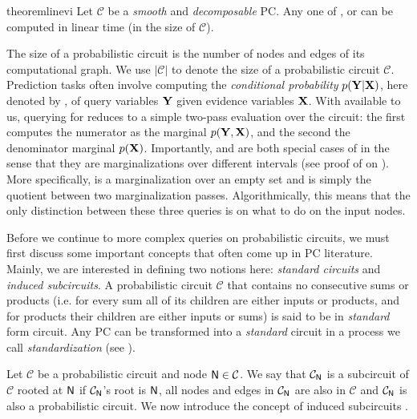 \begin{restatable}{theorem}{linevi}
  \label{thm:linevi}
  Let $\mathcal{C}$ be a \emph{smooth} and \emph{decomposable} PC. Any one of \evi{}, \mar{} or
  \con{} can be computed in linear time (in the size of $\mathcal{C}$).
\end{restatable}

The size of a probabilistic circuit is the number of nodes and edges of its computational graph. We
use $|\mathcal{C}|$ to denote the size of a probabilistic circuit $\mathcal{C}$. Prediction tasks
often involve computing the \emph{conditional probability} $p(\mathbf{Y}|\mathbf{X})$, here denoted by
\con{}, of query variables $\mathbf{Y}$ given evidence variables $\mathbf{X}$. With \mar{} available to
us, querying for \con{} reduces to a simple two-pass evaluation over the circuit: the first
computes the numerator as the marginal $p(\mathbf{Y},\mathbf{X})$, and the second the denominator
marginal $p(\mathbf{X})$. Importantly, \evi{} and \con{} are both special cases of \mar{} in the sense
that they are marginalizations over different intervals (see proof of  on
). More specifically, \evi{} is a marginalization over an empty set and
\con{} is simply the quotient between two marginalization passes. Algorithmically, this means that
the only distinction between these three queries is on what to do on the input nodes.

Before we continue to more complex queries on probabilistic circuits, we must first discuss some
important concepts that often come up in PC literature. Mainly, we are interested in defining two
notions here: \emph{standard circuits} and \emph{induced subcircuits}. A probabilistic circuit
$\mathcal{C}$ that contains no consecutive sums or products (i.e. for every sum all of its children
are either inputs or products, and for products their children are either inputs or sums) is said
to be in \emph{standard} form circuit. Any PC can be transformed into a \emph{standard} circuit in
a process we call \emph{standardization} (see ).

Let $\mathcal{C}$ be a probabilistic circuit and node $\operatorname{\textup{\textsf{N}}}\in\mathcal{C}$. We say that
$\mathcal{C}_{\operatorname{\textup{\textsf{N}}}}$ is a subcircuit of $\mathcal{C}$ rooted at $\operatorname{\textup{\textsf{N}}}$ if $\mathcal{C}_{\operatorname{\textup{\textsf{N}}}}$'s
root is $\operatorname{\textup{\textsf{N}}}$, all nodes and edges in $\mathcal{C}_{\operatorname{\textup{\textsf{N}}}}$ are also in $\mathcal{C}$ and
$\mathcal{C}_{\operatorname{\textup{\textsf{N}}}}$ is also a probabilistic circuit. We now introduce the concept of induced
subcircuits \citep{chan06,dennis15,peharz14}.

